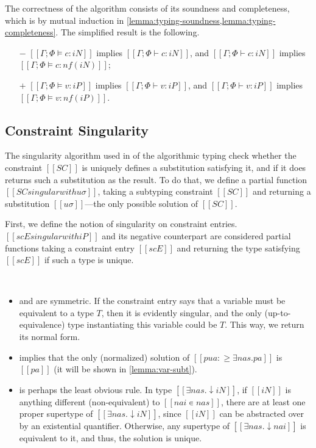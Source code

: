 \documentclass[acmsmall,natbib=false,review,anonymous]{acmart}
\begin{document}
The correctness of the algorithm consists of its soundness and 
completeness, which is by mutual
induction in \cref{lemma:typing-soundness,lemma:typing-completeness}.
The simplified result is the following.
\begin{theorempreview}
  \hfill
  \begin{itemize}
    \item [$-$] $[[Γ; Φ ⊨ c : iN]]$ implies $[[Γ; Φ ⊢ c : iN]]$, 
      and $[[Γ; Φ ⊢ c : iN]]$ implies $[[Γ; Φ ⊨ c : nf(iN)]]$;
    \item [$+$] $[[Γ; Φ ⊨ v : iP]]$ implies $[[Γ; Φ ⊢ v : iP]]$, 
      and $[[Γ; Φ ⊢ v : iP]]$ implies $[[Γ; Φ ⊨ v : nf(iP)]]$.
  \end{itemize}
\end{theorempreview}


\subsection{Constraint Singularity}
\label{sec:constraint-singularity}

The singularity algorithm used in  
of the algorithmic typing check whether the constraint $[[SC]]$
is uniquely defines a substitution satisfying it, and if it does
returns such a substitution as the result.
To do that, we define a partial function $[[SC singular with uσ]]$,
taking a subtyping constraint $[[SC]]$ and returning a substitution 
$[[uσ]]$---the only possible solution of $[[SC]]$. 

First, we define the notion of singularity on constraint entries. 
$[[scE singular with iP]]$ and its negative counterpart 
are considered partial functions taking a constraint entry $[[scE]]$
and returning the type satisfying $[[scE]]$ if such a type is unique. 

\begin{algorithm}
  \hfill\\
  \ottdefnSINGscEPLabeled{}
  \ottdefnSINGscENLabeled{}
\end{algorithm}

\begin{itemize}
  \item {} and  
    are symmetric. If the constraint entry says that a variable must be equivalent to 
    a type $T$, then it is evidently singular, and the only (up-to-equivalence) type
    instantiating this variable could be $T$. This way, we return its normal form. 
  \item {}
    implies that the only (normalized) solution of $[[pua :≥ ∃nas.pa]]$ is 
    $[[pa]]$ (it will be shown in \cref{lemma:var-subt}).
  \item {}
    is perhaps the least obvious rule.
    In type $[[∃nas.↓iN]]$, if $[[iN]]$ is anything different (non-equivalent) to 
    $[[nai ∊ {nas}]]$, there are at least 
    one proper supertype of $[[∃nas.↓iN]]$, since $[[iN]]$ can be abstracted over
    by an existential quantifier. Otherwise, any supertype of $[[∃nas.↓nai]]$
    is equivalent to it, and thus, the solution is unique. 
\end{itemize}
\end{document}
